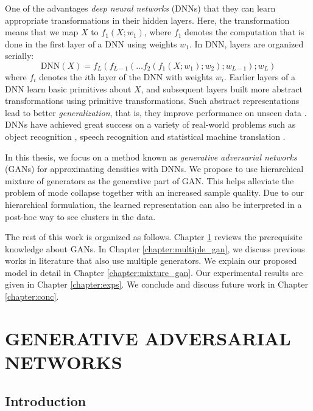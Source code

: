 \documentclass[a4paper,onesided,12pt]{report}
\begin{document}
One of the advantages \emph{deep neural networks} (DNNs) that they can learn appropriate transformations in their hidden layers. Here, the transformation means that we map $X$ to $f_1(X; w_1)$, where $f_1$ denotes the computation that is done in the first layer of a DNN using weights $w_1$. In DNN, layers are organized serially:
\begin{equation}
\text{DNN}(X) = f_L (f_{L-1} ( \dots f_2( f_1(X; w_1); w_2); w_{L-1}); w_L)
\label{eq:dnn}
\end{equation}
where $f_i$ denotes the $i$th layer of the DNN with weights $w_i$. Earlier layers of a DNN learn basic primitives about $X$, and subsequent layers built more abstract transformations using primitive transformations. Such abstract representations lead to better \emph{generalization}, that is, they improve performance on unseen data \cite{bengio2009learning}. DNNs have achieved great success on a variety of real-world problems such as object recognition \cite{krizhevsky2012imagenet}, speech recognition \cite{hinton2012deep} and statistical machine translation \cite{sutskever2014sequence}.

In this thesis, we focus on a method known as \emph{generative adversarial networks} (GANs) \cite{goodfellow2014generative} for approximating densities with DNNs. We propose to use hierarchical mixture of generators as the generative part of GAN. This helps alleviate the problem of mode collapse together with an increased sample quality. Due to our hierarchical formulation, the learned representation can also be interpreted in a post-hoc way to see clusters in the data.

The rest of this work is organized as follows. Chapter \ref{chapter:gan} reviews the prerequisite knowledge about GANs. In Chapter \ref{chapter:multiple_gan}, we discuss previous works in literature that also use multiple generators. We explain our proposed model in detail in Chapter \ref{chapter:mixture_gan}. Our experimental results are given in Chapter \ref{chapter:exps}. We conclude and discuss future work in Chapter \ref{chapter:conc}.

\chapter{GENERATIVE ADVERSARIAL NETWORKS}
\label{chapter:gan}

\section{Introduction}
\label{sec:gan:intro}
\end{document}
